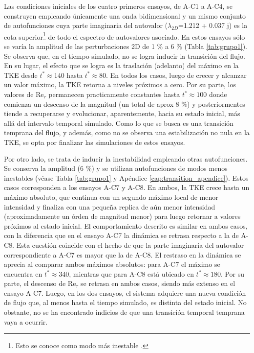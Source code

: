 Las condiciones iniciales de los cuatro primeros ensayos, de A‑C1 a A‑C4, se construyen empleando únicamente una onda bidimensional y un mismo conjunto de autofunciones cuya parte imaginaria del autovalor ($\lambda_{2D}$=1.212 + 0.037 j) es la cota superior\footnote{Esto  se conoce como modo más inestable \cite{schmid}.} de todo el espectro de autovalores asociado. En estos ensayos sólo se varía la amplitud de las perturbaciones 2D de 1 \% a 6 \% (Tabla \ref{tab:grupo1}). Se observa que, en el tiempo simulado, no se logra inducir la transición del flujo. En su lugar, el efecto que se logra es la traslación (adelanto) del máximo en la TKE desde $t^* \approx 140$ hasta $t^* \approx 80$. En todos los casos, luego de crecer y alcanzar un valor máximo, la TKE retorna a niveles próximos a cero. Por su parte, los valores de Re$_{\tau}$ permanecen practicamente constantes hasta $t^* \approx 100$ donde comienza un descenso de la magnitud (un total de aprox 8 \%) y posteriormentes tiende a recuperarse y evolucionar, aparentemente, hacia su estado inicial, más allá del intervalo temporal simulado. Como lo que se busca es una transición temprana del flujo, y además, como no se observa una estabilización no nula en la TKE, se opta por finalizar las simulaciones de estos ensayos.  

Por otro lado, se trata de inducir la inestabilidad empleando otras autofunciones. Se conserva la amplitud (6 \%) y se utilizan autofunciones de modos menos inestables (véase Tabla \ref{tab:grupo1} y Apéndice \ref{cap:transition_apendice}). Estos casos corresponden a los ensayos A-C7 y A-C8. En ambos, la TKE crece hasta un máximo absoluto, que continua con un segundo máximo local de menor intensidad y finaliza con una pequeña replica de aún menor intensidad (aproximadamente un órden de magnitud menor) para luego retornar a valores próximos al estado inicial. El comportamiento descrito es similar en ambos casos, con la diferencia que en el ensayo A-C7 la dinámica se retrasa respecto a la de A-C8. Esta cuestión coincide con el hecho de que la parte imaginaria del autovalor correspondiente a A-C7 es mayor que la de A-C8. El restraso en la dinámica se aprecia al comparar ambos máximos absolutos: para A-C7 el máximo se encuentra en $t^* \approx 340$, mientras que para A-C8 está ubicado en  $t^* \approx 180$. Por su parte, el descenso de Re$_{\tau}$ se retrasa en ambos casos, siendo más extenso en el ensayo A-C7. Luego, en los dos ensayos, el sistema adquiere una nueva condición de flujo que, al menos hasta el tiempo simulado, es distinta del estado inicial. No obstante, no se ha encontrado indicios de que una transición temporal temprana vaya a ocurrir.  

